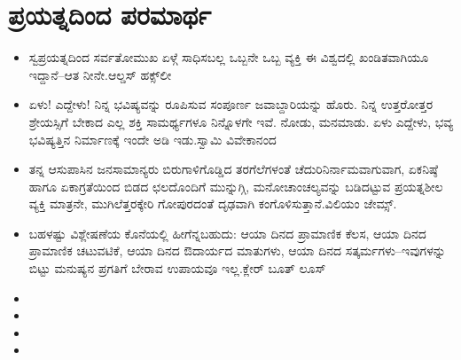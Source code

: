 
\chapter{ಪ್ರಯತ್ನದಿಂದ ಪರಮಾರ್ಥ}

\indentsecionsintoc

\begin{itemize}
\item ಸ್ವಪ್ರಯತ್ನದಿಂದ ಸರ್ವತೋಮುಖ ಏಳ್ಗೆ ಸಾಧಿಸಬಲ್ಲ ಒಬ್ಬನೇ ಒಬ್ಬ ವ್ಯಕ್ತಿ ಈ ವಿಶ್ವದಲ್ಲಿ ಖಂಡಿತವಾಗಿಯೂ ಇದ್ದಾನೆ–ಆತ ನೀನೇ.\hfill {}ಆಲ್ಡಸ್ ಹಕ್ಸ್​ಲೀ

 \item ಏಳು! ಎದ್ದೇಳು! ನಿನ್ನ ಭವಿಷ್ಯವನ್ನು ರೂಪಿಸುವ ಸಂಪೂರ್ಣ ಜವಾಬ್ದಾರಿಯನ್ನು ಹೊರು. ನಿನ್ನ ಉತ್ತರೋತ್ತರ ಶ್ರೇಯಸ್ಸಿಗೆ ಬೇಕಾದ ಎಲ್ಲ ಶಕ್ತಿ ಸಾಮರ್ಥ್ಯಗಳೂ ನಿನ್ನೊಳಗೇ ಇವೆ. ನೋಡು, ಮನಮಾಡು. ಏಳು ಎದ್ದೇಳು, ಭವ್ಯ ಭವಿಷ್ಯತ್ತಿನ ನಿರ್ಮಾಣಕ್ಕೆ ಇಂದೇ ಅಡಿ ಇಡು.\hfill {}ಸ್ವಾಮಿ ವಿವೇಕಾನಂದ

 \item ತನ್ನ ಆಸುಪಾಸಿನ ಜನಸಾಮಾನ್ಯರು ಬಿರುಗಾಳಿಗೊಡ್ಡಿದ ತರಗೆಲೆಗಳಂತೆ ಚೆದುರಿ\break ನಿರ್ನಾಮವಾಗುವಾಗ, ಏಕನಿಷ್ಠೆ ಹಾಗೂ ಏಕಾಗ್ರತೆಯಿಂದ ಬಿಡದ ಛಲದೊಂದಿಗೆ ಮುನ್ನುಗ್ಗಿ, ಮನೋಚಾಂಚಲ್ಯವನ್ನು ಬಡಿದಟ್ಟುವ ಪ್ರಯತ್ನಶೀಲ ವ್ಯಕ್ತಿ ಮಾತ್ರನೇ, ಮುಗಿಲೆತ್ತರಕ್ಕೇರಿ ಗೋಪುರದಂತೆ ದೃಢವಾಗಿ ಕಂಗೊಳಿಸುತ್ತಾನೆ.\hfill {}ವಿಲಿಯಂ ಜೇಮ್ಸ್.

 \item ಬಹಳಷ್ಟು ವಿಶ್ಲೇಷಣೆಯ ಕೊನೆಯಲ್ಲಿ ಹೀಗೆನ್ನಬಹುದು: ಆಯಾ ದಿನದ ಪ್ರಾಮಾಣಿಕ ಕೆಲಸ, ಆಯಾ ದಿನದ ಪ್ರಾಮಾಣಿಕ ಚಟುವಟಿಕೆ, ಆಯಾ ದಿನದ ಔದಾರ್ಯದ ಮಾತುಗಳು, ಆಯಾ ದಿನದ ಸತ್ಕರ್ಮಗಳು–ಇವುಗಳನ್ನು ಬಿಟ್ಟು ಮನುಷ್ಯನ ಪ್ರಗತಿಗೆ ಬೇರಾವ ಉಪಾಯವೂ ಇಲ್ಲ.\hfill {}ಕ್ಲೇರ್ ಬೂತ್ ಲೂಸ್​

 \item {}

 \item {}

 \item {}

 \item {}

\end{itemize}


